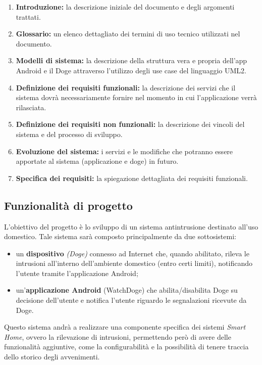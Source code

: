 \documentclass{article}
\begin{document}
\begin{enumerate}
\item \textbf{Introduzione:} la descrizione iniziale del documento e degli argomenti trattati.
\item \textbf{Glossario:} un elenco dettagliato dei termini di uso tecnico utilizzati nel documento.
\item \textbf{Modelli di sistema:}  la descrizione della struttura vera e propria dell’app Android e il Doge attraverso l’utilizzo degli use case del linguaggio UML2.
\item \textbf{Definizione dei requisiti funzionali:} la descrizione dei servizi che il sistema dovrà necessariamente fornire nel momento in cui l’applicazione verrà rilasciata.
\item \textbf{Definizione dei requisiti non funzionali:} la descrizione dei vincoli del sistema e del processo di sviluppo.
\item \textbf{Evoluzione del sistema:} i servizi e le modifiche che potranno essere apportate al sistema (applicazione e doge) in futuro.
\item \textbf{Specifica dei requisiti:} la spiegazione dettagliata dei requisiti funzionali.
\end{enumerate}

\subsection{Funzionalità di progetto}

L'obiettivo del progetto è lo sviluppo di un sistema antintrusione destinato all'uso domestico.
Tale sistema sarà composto principalmente da due sottosistemi:
\begin{itemize}
\item un \textbf{dispositivo} \textit{(Doge)} connesso ad Internet che, quando abilitato, rileva le intrusioni all'interno dell'ambiente domestico (entro certi limiti), notificando l'utente tramite l'applicazione Android;
\item un'\textbf{applicazione Android} (WatchDoge) che abilita/disabilita Doge su decisione dell'utente e notifica l'utente riguardo le segnalazioni ricevute da Doge.
\end{itemize}

Questo sistema andrà a realizzare una componente specifica dei sistemi \textit{Smart Home}, ovvero la rilevazione di intrusioni, permettendo però di avere delle funzionalità aggiuntive, come la configurabilità e la possibilità di tenere traccia dello storico degli avvenimenti.
\end{document}

